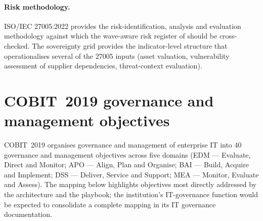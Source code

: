 \paragraph{Risk methodology.} ISO/IEC 27005:2022 provides the
risk-identification, analysis and evaluation methodology against
which the wave-aware risk register of 
should be cross-checked. The sovereignty grid provides the
indicator-level structure that operationalises several of the
27005 inputs (asset valuation, vulnerability assessment of
supplier dependencies, threat-context evaluation).

\section{COBIT~2019 governance and management objectives}
\label{sec:rm-cobit}

COBIT~2019 organises governance and management of enterprise IT
into 40 governance and management objectives across five domains
(EDM --- Evaluate, Direct and Monitor; APO --- Align, Plan and
Organise; BAI --- Build, Acquire and Implement; DSS --- Deliver,
Service and Support; MEA --- Monitor, Evaluate and Assess). The
mapping below highlights objectives most directly addressed by
the architecture and the playbook; the institution's IT-governance function
would be expected to consolidate a complete mapping in its IT
governance documentation.

